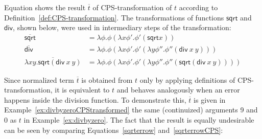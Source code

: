 Equation shows the result $\overline{t}$ of CPS-transformation of $t$ according to Definition~\ref{def:CPS-transformation}.
The transformations of functions $\mathsf{sqrt} $ and $\mathsf{div} $, shown below, were used in intermediary steps of the transformation:
\begin{subequations}
\begin{align}
\overline{\mathsf{sqrt}} & = \lambda \phi . \phi ( \lambda x \phi'  . \phi'(  \mathsf{sqrt}  x))  \label{sqrt-3} \\
\overline{\mathsf{div}} & = \lambda \phi . \phi  (  \lambda x \phi' . \phi' ( \lambda y \phi''. \phi '' ( \mathsf{div} \ x \ y))) \label{div-3}  \\
\overline{\lambda xy. \mathsf{sqrt} (\mathsf{div} \ x \ y)}  & = \lambda \phi. \phi ( \lambda x \phi'. \phi' ( \lambda y \phi ''. \phi''  (\mathsf{sqrt} ( \mathsf{div} \ x\ y )))) \label{eq:exdivbyzero} 
\end{align} 
\end{subequations}



Since normalized term $\overline{t}$ is obtained from $t$ only by applying definitions of CPS-transformation, it is equivalent to $t$  and behaves analogously when an error happens inside the division function. To demonstrate this, $\overline{t}$ is given in Example~\ref{ex:divbyzeroCPStransformed} the same (continuized) arguments 9 and 0 as $t$ in Example~\ref{ex:divbyzero}. The fact that the result is equally undesirable can be seen by comparing Equations~\eqref{sqrterrow} and~\eqref{sqrterrowCPS}:

